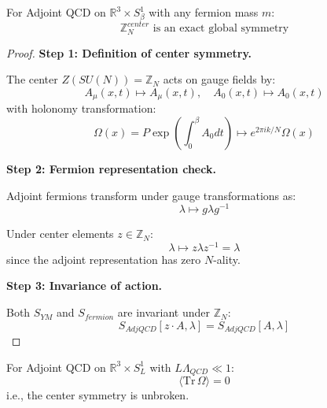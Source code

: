 \begin{theorem}
\label{thm:center-exact}
For Adjoint QCD on $\mathbb{R}^3 \times S^1_\beta$ with any fermion mass $m$:
\begin{equation}
\mathbb{Z}_N^{center} \text{ is an exact global symmetry}
\end{equation}
\end{theorem}

\begin{proof}
\textbf{Step 1: Definition of center symmetry.}

The center $Z(SU(N)) = \mathbb{Z}_N$ acts on gauge fields by:
\begin{equation}
A_\mu(x, t) \mapsto A_\mu(x, t), \quad A_0(x, t) \mapsto A_0(x, t)
\end{equation}
with holonomy transformation:
\begin{equation}
\Omega(x) = P \exp\left(\int_0^\beta A_0 dt\right) \mapsto e^{2\pi i k/N} \Omega(x)
\end{equation}

\textbf{Step 2: Fermion representation check.}

Adjoint fermions transform under gauge transformations as:
\begin{equation}
\lambda \mapsto g \lambda g^{-1}
\end{equation}

Under center elements $z \in \mathbb{Z}_N$:
\begin{equation}
\lambda \mapsto z \lambda z^{-1} = \lambda
\end{equation}
since the adjoint representation has zero $N$-ality.

\textbf{Step 3: Invariance of action.}

Both $S_{YM}$ and $S_{fermion}$ are invariant under $\mathbb{Z}_N$:
\begin{equation}
S_{AdjQCD}[z \cdot A, \lambda] = S_{AdjQCD}[A, \lambda]
\end{equation}
\end{proof}

\begin{theorem}
\label{thm:center-unbroken}
For Adjoint QCD on $\mathbb{R}^3 \times S^1_L$ with $L\Lambda_{QCD} \ll 1$:
\begin{equation}
\langle \mathrm{Tr}\, \Omega \rangle = 0
\end{equation}
i.e., the center symmetry is unbroken.
\end{theorem}

